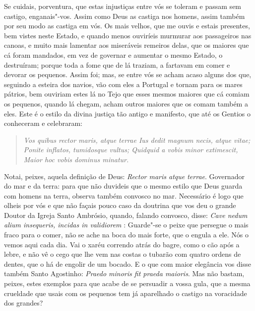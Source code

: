 Se cuidais, porventura, que estas injustiças entre vós se toleram e
passam sem castigo, enganais"-vos. Assim como Deus as castiga nos homens,
assim também por seu modo as castiga em vós. Os mais velhos, que me
ouvis e estais presentes, bem vistes neste Estado, e quando menos
ouviríeis murmurar aos passageiros nas canoas, e muito mais lamentar aos
miseráveis remeiros delas, que os maiores que cá foram mandados, em vez
de governar e aumentar o mesmo Estado, o destruíram; porque toda a fome
que de lá traziam, a fartavam em comer e devorar os pequenos.
Assim foi; mas, se entre vós se acham acaso alguns dos que, seguindo a
esteira dos navios, vão com eles a Portugal e tornam para os mares
pátrios, bem ouviriam estes lá no Tejo que esses mesmos maiores que cá
comiam os pequenos, quando lá chegam, acham outros maiores que os comam
também a eles. Este é o estilo da divina justiça tão antigo e manifesto,
que até os Gentios o conheceram e celebraram:

\begin{quote}
\emph{Vos quibus rector maris, atque terrae Ius dedit magnum necis,
atque vitae; Ponite inflatos, tumidosque vultus; Quidquid a vobis minor
extimescit, Maior hoc vobis dominus minatur.}

\end{quote}

Notai, peixes, aquela definição de Deus: \emph{Rector maris atque
terrae}. Governador do mar e da terra: para que não duvideis que o mesmo estilo
que Deus guarda com homens na terra, observa também convosco no mar.
Necessário é logo que olheis por vós e que não façais pouco caso da
doutrina que vos deu o grande Doutor da Igreja Santo Ambrósio, quando,
falando convosco, disse: \emph{Cave nedum alium insequeris, incidas in
validiorem} : Guarde"-se o peixe que persegue o mais fraco para o comer,
não se ache na boca do mais forte, que o engula a ele. Nós o vemos aqui
cada dia. Vai o xaréu correndo atrás do bagre, como o cão após a lebre,
e não vê o cego que lhe vem nas costas o tubarão com quatro ordens de
dentes, que o há de engolir de um bocado. E o que com maior elegância
vos disse também Santo Agostinho: \emph{Praedo minoris fit praeda
maioris}. Mas não bastam, peixes, estes exemplos para que acabe de se
persuadir a vossa gula, que a mesma crueldade que usais com os pequenos
tem já aparelhado o castigo na voracidade dos grandes?

